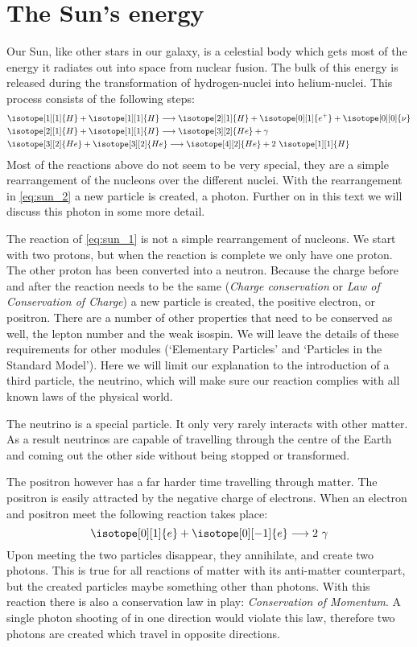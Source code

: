 \section{The Sun's energy}
Our Sun, like other stars in our galaxy, is a celestial body which gets most of the energy it radiates out into space from nuclear fusion. The bulk of this energy is released during the transformation of hydrogen-nuclei into helium-nuclei. This process consists of the following steps:
\begin{align}
& \isotope[1][1]{H} +\isotope[1][1]{H} \longrightarrow \isotope[2][1]{H} + \isotope[0][1]{e^+} + \isotope[0][0]{\nu} \label{eq:sun_1}\\
& \isotope[2][1]{H} + \isotope[1][1]{H}\longrightarrow \isotope[3][2]{He} + \gamma \label{eq:sun_2}\\
& \isotope[3][2]{He} + \isotope[3][2]{He} \longrightarrow \isotope[4][2]{He} + 2~\isotope[1][1]{H} \label{eq:sun_3}
\end{align}
Most of the reactions above do not seem to be very special, they are a simple rearrangement of the nucleons over the different nuclei. With the rearrangement in \ref{eq:sun_2} a new particle is created, a photon. Further on in this text we will discuss this photon in some more detail.

The reaction of \ref{eq:sun_1} is not a simple rearrangement of nucleons. We start with two protons, but when the reaction is complete we only have one proton. The other proton has been converted into a neutron. Because the charge before and after the reaction needs to be the same (\textit{Charge conservation} or \textit{Law of Conservation of Charge}) a new particle is created, the positive electron, or positron. There are a number of other properties that need to be conserved as well, the lepton number and the weak isospin. We will leave the details of these requirements for other modules (`Elementary Particles' and `Particles in the Standard Model'). Here we will limit our explanation to the introduction of a third particle, the neutrino, which will make sure our reaction complies with all known laws of the physical world.

The neutrino is a special particle. It only very rarely interacts with other matter. As a result neutrinos are capable of travelling through the centre of the Earth and coming out the other side without being stopped or transformed.

The positron however has a far harder time travelling through matter. The positron is easily attracted by the negative charge of electrons. When an electron and positron meet the following reaction takes place:
\begin{equation}
\isotope[0][1]{e} + \isotope[0][-1]{e}  \longrightarrow 2~\gamma
\end{equation}
Upon meeting the two particles disappear, they annihilate, and create two photons. This is true for all reactions of matter with its anti-matter counterpart, but the created particles maybe something other than photons. With this reaction there is also a conservation law in play: \textit{Conservation of Momentum}. A single photon shooting of in one direction would violate this law, therefore two photons are created which travel in opposite directions.

